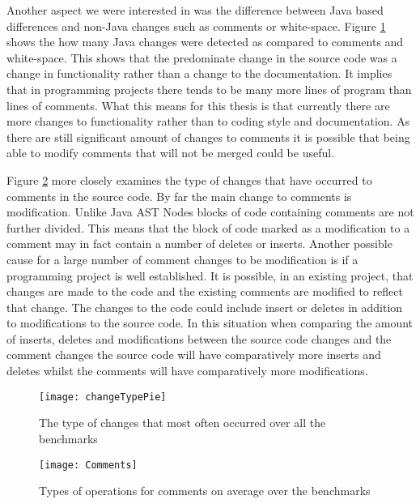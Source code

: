 Another aspect we were interested in was the difference between Java based differences and non-Java changes such as comments or white-space.
Figure \ref{fig:changeType} shows the how many Java changes were detected as compared to comments and white-space.
This shows that the predominate change in the source code was a change in functionality rather than a change to the documentation.
It implies that in programming projects there tends to be many more lines of program than lines of comments.
What this means for this thesis is that currently there are more changes to functionality rather than to coding style and documentation.
As there are still significant amount of changes to comments it is possible that being able to modify comments that will not be merged could be useful.  

Figure \ref{fig:commentsPie} more closely examines the type of changes that have occurred to comments in the source code.
By far the main change to comments is modification.
Unlike Java AST Nodes blocks of code containing comments are not further divided.
This means that the block of code marked as a modification to a comment may in fact contain a number of deletes or inserts.
Another possible cause for a large number of comment changes to be modification is if a programming project is well established.
It is possible, in an existing project, that changes are made to the code and the existing comments are modified to reflect that change.
The changes to the code could include insert or deletes in addition to modifications to the source code.
In this situation when comparing the amount of inserts, deletes and modifications between the source code changes and the comment changes the source code will have comparatively more inserts and deletes whilst the comments will have comparatively more modifications.

\begin{figure}[p] 
 \begin{center}
 \texttt{[image: changeTypePie]}
 \end{center}
 \caption{The type of changes that most often occurred over all the benchmarks}
 \label{fig:changeType}
\end{figure}

\begin{figure}[p] 
 \begin{center}
 \texttt{[image: Comments]}
 \end{center}
 \caption{Types of operations for comments on average over the benchmarks}
 \label{fig:commentsPie}
\end{figure} ~\\

